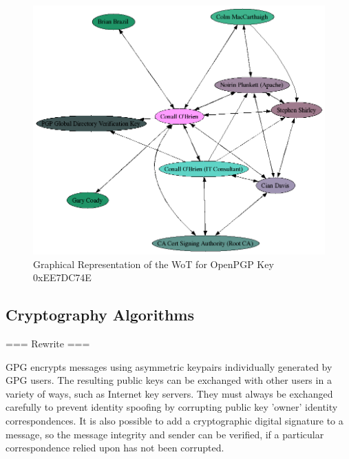 \begin{figure}[p]

\label{fig:wot}

\begin{center}

\includegraphics[bb= 0 0 868 739,scale=0.5]{include/EE7DC74E.png}

\end{center}

\caption{Graphical Representation of the WoT for OpenPGP Key 0xEE7DC74E}

\end{figure}

\pagebreak

\subsection{Cryptography Algorithms}

=== Rewrite ===


GPG encrypts messages using asymmetric keypairs individually generated
by GPG users. The resulting public keys can be exchanged with other
users in a variety of ways, such as Internet key servers. They must
always be exchanged carefully to prevent identity spoofing by
corrupting public key 'owner' identity correspondences. It is
also possible to add a cryptographic digital signature to a message, so
the message integrity and sender can be verified, if a particular
correspondence relied upon has not been corrupted.


